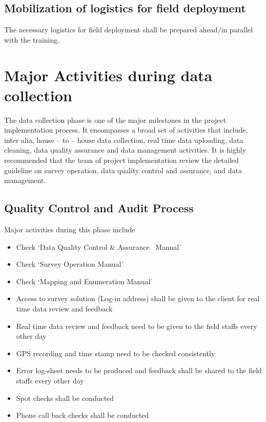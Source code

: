 \documentclass[
]{book}
\theoremstyle{definition}
\theoremstyle{definition}
\theoremstyle{definition}
\theoremstyle{definition}
\theoremstyle{remark}
\begin{document}
\hypertarget{mobilization-of-logistics-for-field-deployment}{%
\subsection{Mobilization of logistics for field deployment}\label{mobilization-of-logistics-for-field-deployment}}

The necessary logistics for field deployment shall be prepared ahead/in parallel with the training.

\hypertarget{major-activities-during-data-collection}{%
\section{Major Activities during data collection}\label{major-activities-during-data-collection}}

The data collection phase is one of the major milestones in the project implementation process. It encompasses a broad set of activities that include, inter alia, house -- to -- house data collection, real time data uploading, data cleaning, data quality assurance and data management activities. It is highly recommended that the team of project implementation review the detailed guideline on survey operation, data quality control and assurance, and data management.

\hypertarget{quality-control-and-audit-process}{%
\subsection{Quality Control and Audit Process}\label{quality-control-and-audit-process}}

Major activities during this phase include

\begin{itemize}
\item
  Check `Data Quality Control \& Assurance~ Manual'
\item
  Check `Survey Operation Manual'
\item
  Check `Mapping and Enumeration Manual'
\item
  Access to survey solution (Log-in address) shall be given to the client for real time data review and feedback
\item
  Real time data review and feedback need to be given to the field staffs every other day
\item
  GPS recording and time stamp need to be checked consistently
\item
  Error log-sheet needs to be produced and feedback shall be shared to the field staffs every other day
\item
  Spot checks shall be conducted
\item
  Phone call back checks shall be conducted
\end{itemize}
\end{document}
